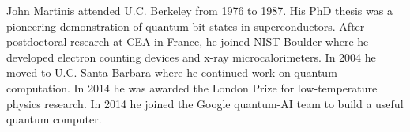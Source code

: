 \documentclass[journal]{IEEEtran}
\begin{document}
\begin{IEEEbiography}{John Martinis} attended U.C. Berkeley from 1976 to 1987.  His PhD thesis was a pioneering demonstration of quantum-bit states in superconductors. After postdoctoral research at CEA in France, he joined NIST Boulder where he developed electron counting devices and x-ray microcalorimeters.  In 2004 he moved to U.C. Santa Barbara where he continued work on quantum computation.  In 2014 he was awarded the London Prize for low-temperature physics research.  In 2014 he joined the Google quantum-AI team to build a useful quantum computer. 

\end{IEEEbiography}
\end{document}
